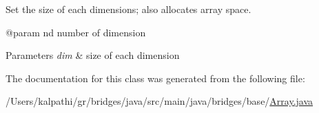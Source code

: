 Set the size of each dimensions; also allocates array space. 

\begin{DoxyVerb}@param nd number of dimension
\end{DoxyVerb}
 
\begin{DoxyParams}{Parameters}
{\em dim} & size of each dimension \\
\hline
\end{DoxyParams}


The documentation for this class was generated from the following file\+:\begin{DoxyCompactItemize}
\item 
/\+Users/kalpathi/gr/bridges/java/src/main/java/bridges/base/\mbox{\hyperlink{_array_8java}{Array.\+java}}\end{DoxyCompactItemize}
